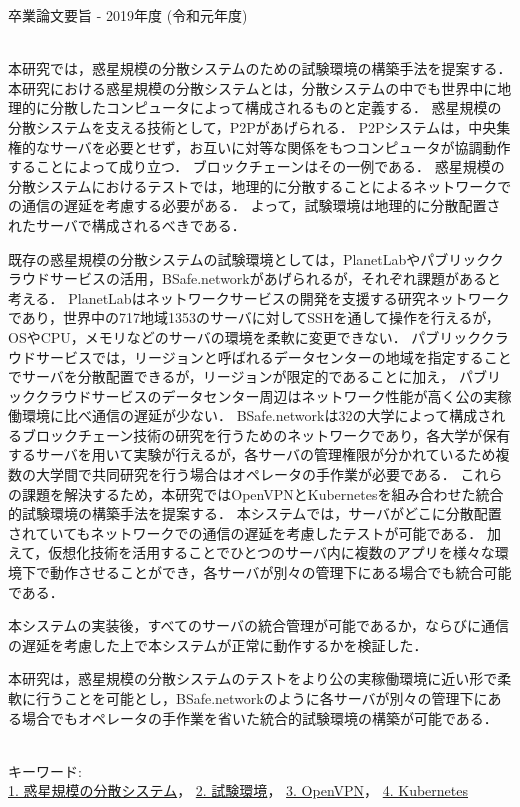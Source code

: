 卒業論文要旨 - 2019年度 (令和元年度)
\begin{center}
\begin{large}
\end{large}
\end{center}

~ \\
本研究では，惑星規模の分散システムのための試験環境の構築手法を提案する．
本研究における惑星規模の分散システムとは，分散システムの中でも世界中に地理的に分散したコンピュータによって構成されるものと定義する．
惑星規模の分散システムを支える技術として，P2Pがあげられる．
P2Pシステムは，中央集権的なサーバを必要とせず，お互いに対等な関係をもつコンピュータが協調動作することによって成り立つ．
ブロックチェーンはその一例である．
惑星規模の分散システムにおけるテストでは，地理的に分散することによるネットワークでの通信の遅延を考慮する必要がある．
よって，試験環境は地理的に分散配置されたサーバで構成されるべきである．

既存の惑星規模の分散システムの試験環境としては，PlanetLabやパブリッククラウドサービスの活用，BSafe.networkがあげられるが，それぞれ課題があると考える．
PlanetLabはネットワークサービスの開発を支援する研究ネットワークであり，世界中の717地域1353のサーバに対してSSHを通して操作を行えるが，OSやCPU，メモリなどのサーバの環境を柔軟に変更できない．
パブリッククラウドサービスでは，リージョンと呼ばれるデータセンターの地域を指定することでサーバを分散配置できるが，リージョンが限定的であることに加え，
パブリッククラウドサービスのデータセンター周辺はネットワーク性能が高く公の実稼働環境に比べ通信の遅延が少ない．
BSafe.networkは32の大学によって構成されるブロックチェーン技術の研究を行うためのネットワークであり，各大学が保有するサーバを用いて実験が行えるが，各サーバの管理権限が分かれているため複数の大学間で共同研究を行う場合はオペレータの手作業が必要である．
これらの課題を解決するため，本研究ではOpenVPNとKubernetesを組み合わせた統合的試験環境の構築手法を提案する．
本システムでは，サーバがどこに分散配置されていてもネットワークでの通信の遅延を考慮したテストが可能である．
加えて，仮想化技術を活用することでひとつのサーバ内に複数のアプリを様々な環境下で動作させることができ，各サーバが別々の管理下にある場合でも統合可能である．

本システムの実装後，すべてのサーバの統合管理が可能であるか，ならびに通信の遅延を考慮した上で本システムが正常に動作するかを検証した．

本研究は，惑星規模の分散システムのテストをより公の実稼働環境に近い形で柔軟に行うことを可能とし，BSafe.networkのように各サーバが別々の管理下にある場合でもオペレータの手作業を省いた統合的試験環境の構築が可能である．

~ \\
キーワード:\\
\underline{1. 惑星規模の分散システム}，
\underline{2. 試験環境}，
\underline{3. OpenVPN}，
\underline{4. Kubernetes}

\begin{flushright}
\dept \\
\author
\end{flushright}
